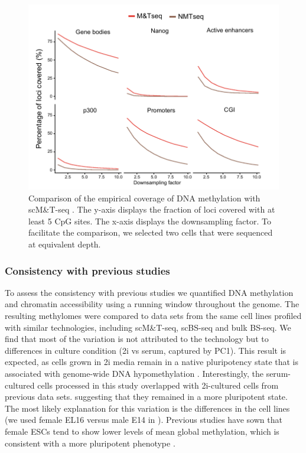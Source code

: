 \begin{figure}[H]
	\centering
	\includegraphics[width=0.8\linewidth]{scNMT_coverage2}
	\caption[]{Comparison of the empirical coverage of DNA methylation with scM\&T-seq \cite{Angermueller2016}.
	The y-axis displays the fraction of loci covered with at least 5 CpG sites. The x-axis displays the downsampling factor. To facilitate the comparison, we selected two cells that were sequenced at equivalent depth.}
	\label{fig:scnmt_coverage2}
\end{figure}

\subsubsection{Consistency with previous studies}

To assess the consistency with previous studies we quantified DNA methylation and chromatin accessibility using a running window throughout the genome. The resulting methylomes were compared to data sets from the same cell lines profiled with similar technologies, including scM\&T-seq\cite{Angermueller2016}, scBS-seq\cite{Smallwood2014} and bulk BS-seq\cite{Ficz2013}. We find that most of the variation is not attributed to the technology but to differences in culture condition (2i vs serum, captured by PC1). This result is expected, as cells grown in 2i media remain in a native pluripotency state that is associated with genome-wide DNA hypomethylation \cite{Ficz2013}. Interestingly, the serum-cultured cells processed in this study overlapped with 2i-cultured cells from previous data sets. suggesting that they remained in a more pluripotent state. The most likely explanation for this variation is the differences in the cell lines (we used female EL16 versus male E14 in \cite{Angermueller2016,Smallwood2014,Ficz2013}). Previous studies have sown that female ESCs tend to show lower levels of mean global methylation, which is consistent with a more pluripotent phenotype \cite{Zvetkova2005}.\\

